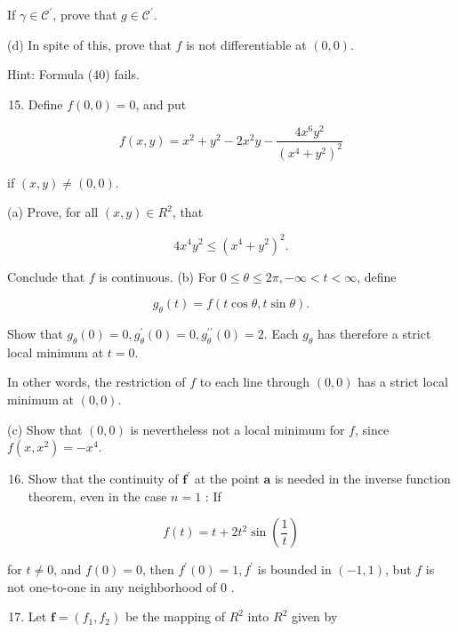 \documentclass[10pt]{article}
\begin{document}
If $\gamma \in \mathscr{C}^{\prime}$, prove that $g \in \mathscr{C}^{\prime}$.

(d) In spite of this, prove that $f$ is not differentiable at $(0,0)$.

Hint: Formula (40) fails.

\begin{enumerate}
  \setcounter{enumi}{14}
  \item Define $f(0,0)=0$, and put
\end{enumerate}

$$
f(x, y)=x^{2}+y^{2}-2 x^{2} y-\frac{4 x^{6} y^{2}}{\left(x^{4}+y^{2}\right)^{2}}
$$

if $(x, y) \neq(0,0)$.

(a) Prove, for all $(x, y) \in R^{2}$, that

$$
4 x^{4} y^{2} \leq\left(x^{4}+y^{2}\right)^{2} .
$$

Conclude that $f$ is continuous. (b) For $0 \leq \theta \leq 2 \pi,-\infty<t<\infty$, define

$$
g_{\theta}(t)=f(t \cos \theta, t \sin \theta) .
$$

Show that $g_{\theta}(0)=0, g_{\theta}^{\prime}(0)=0, g_{\theta}^{\prime \prime}(0)=2$. Each $g_{\theta}$ has therefore a strict local minimum at $t=0$.

In other words, the restriction of $f$ to each line through $(0,0)$ has a strict local minimum at $(0,0)$.

(c) Show that $(0,0)$ is nevertheless not a local minimum for $f$, since $f\left(x, x^{2}\right)=-x^{4}$.

\begin{enumerate}
  \setcounter{enumi}{15}
  \item Show that the continuity of $\mathbf{f}^{\prime}$ at the point $\mathbf{a}$ is needed in the inverse function theorem, even in the case $n=1$ : If
\end{enumerate}

$$
f(t)=t+2 t^{2} \sin \left(\frac{1}{t}\right)
$$

for $t \neq 0$, and $f(0)=0$, then $f^{\prime}(0)=1, f^{\prime}$ is bounded in $(-1,1)$, but $f$ is not one-to-one in any neighborhood of 0 .

\begin{enumerate}
  \setcounter{enumi}{16}
  \item Let $\mathbf{f}=\left(f_{1}, f_{2}\right)$ be the mapping of $R^{2}$ into $R^{2}$ given by
\end{enumerate}
\end{document}
